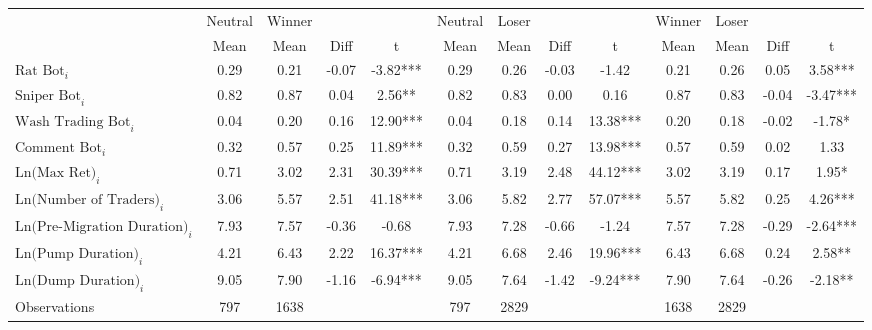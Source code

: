 \begin{tabular}{lcccccccccccc}
\hline
& Neutral & Winner & & & Neutral & Loser & & & Winner & Loser & & \\
\cline{2-13}
& Mean & Mean & Diff & t & Mean & Mean & Diff & t & Mean & Mean & Diff & t \\
\hline
$\text{Rat Bot}_{i}$ & 0.29 & 0.21 & -0.07 & -3.82*** & 0.29 & 0.26 & -0.03 & -1.42 & 0.21 & 0.26 & 0.05 & 3.58*** \\
$\text{Sniper Bot}_{i}$ & 0.82 & 0.87 & 0.04 & 2.56** & 0.82 & 0.83 & 0.00 & 0.16 & 0.87 & 0.83 & -0.04 & -3.47*** \\
$\text{Wash Trading Bot}_{i}$ & 0.04 & 0.20 & 0.16 & 12.90*** & 0.04 & 0.18 & 0.14 & 13.38*** & 0.20 & 0.18 & -0.02 & -1.78* \\
$\text{Comment Bot}_{i}$ & 0.32 & 0.57 & 0.25 & 11.89*** & 0.32 & 0.59 & 0.27 & 13.98*** & 0.57 & 0.59 & 0.02 & 1.33 \\
$\text{Ln(Max Ret)}_{i}$ & 0.71 & 3.02 & 2.31 & 30.39*** & 0.71 & 3.19 & 2.48 & 44.12*** & 3.02 & 3.19 & 0.17 & 1.95* \\
$\text{Ln(Number of Traders)}_{i}$ & 3.06 & 5.57 & 2.51 & 41.18*** & 3.06 & 5.82 & 2.77 & 57.07*** & 5.57 & 5.82 & 0.25 & 4.26*** \\
$\text{Ln(Pre-Migration Duration)}_{i}$ & 7.93 & 7.57 & -0.36 & -0.68 & 7.93 & 7.28 & -0.66 & -1.24 & 7.57 & 7.28 & -0.29 & -2.64*** \\
$\text{Ln(Pump Duration)}_{i}$ & 4.21 & 6.43 & 2.22 & 16.37*** & 4.21 & 6.68 & 2.46 & 19.96*** & 6.43 & 6.68 & 0.24 & 2.58** \\
$\text{Ln(Dump Duration)}_{i}$ & 9.05 & 7.90 & -1.16 & -6.94*** & 9.05 & 7.64 & -1.42 & -9.24*** & 7.90 & 7.64 & -0.26 & -2.18** \\
\hline
Observations & 797 & 1638 & & & 797 & 2829 & & & 1638 & 2829 & & \\
\hline
\end{tabular}